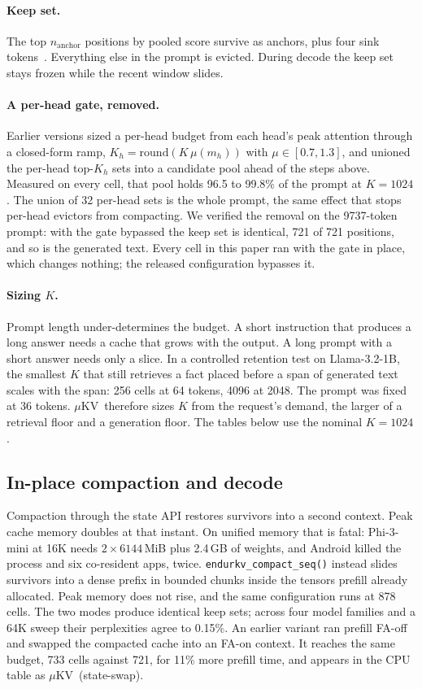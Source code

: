\documentclass[sigconf, anonymous=false, screen=true]{acmart}
\newcommand{\muKV}{$\mu$KV}
\begin{document}
\paragraph{Keep set.} The top $n_\mathrm{anchor}$ positions by pooled score survive as anchors, plus four sink tokens~\cite{xiao2024streamingllm}. Everything else in the prompt is evicted. During decode the keep set stays frozen while the recent window slides.

\paragraph{A per-head gate, removed.} Earlier versions sized a per-head budget from each head's peak attention through a closed-form ramp, $K_h = \mathrm{round}(K\,\mu(m_h))$ with $\mu\in[0.7,1.3]$, and unioned the per-head top-$K_h$ sets into a candidate pool ahead of the steps above. Measured on every cell, that pool holds 96.5 to 99.8\% of the prompt at $K{=}1024$. The union of 32 per-head sets is the whole prompt, the same effect that stops per-head evictors from compacting. We verified the removal on the 9737-token prompt: with the gate bypassed the keep set is identical, 721 of 721 positions, and so is the generated text. Every cell in this paper ran with the gate in place, which changes nothing; the released configuration bypasses it.

\paragraph{Sizing $K$.} Prompt length under-determines the budget. A short instruction that produces a long answer needs a cache that grows with the output. A long prompt with a short answer needs only a slice. In a controlled retention test on Llama-3.2-1B, the smallest $K$ that still retrieves a fact placed before a span of generated text scales with the span: 256 cells at 64 tokens, 4096 at 2048. The prompt was fixed at 36 tokens. \muKV\ therefore sizes $K$ from the request's demand, the larger of a retrieval floor and a generation floor. The tables below use the nominal $K{=}1024$.

\subsection{In-place compaction and decode}
\label{sec:design-compact}

Compaction through the state API restores survivors into a second context. Peak cache memory doubles at that instant. On unified memory that is fatal: Phi-3-mini at 16K needs $2\times6144$\,MiB plus 2.4\,GB of weights, and Android killed the process and six co-resident apps, twice. \texttt{endurkv\_compact\_seq()} instead slides survivors into a dense prefix in bounded chunks inside the tensors prefill already allocated. Peak memory does not rise, and the same configuration runs at 878 cells. The two modes produce identical keep sets; across four model families and a 64K sweep their perplexities agree to 0.15\%. An earlier variant ran prefill FA-off and swapped the compacted cache into an FA-on context. It reaches the same budget, 733 cells against 721, for 11\% more prefill time, and appears in the CPU table as \muKV\ (state-swap).
\end{document}
